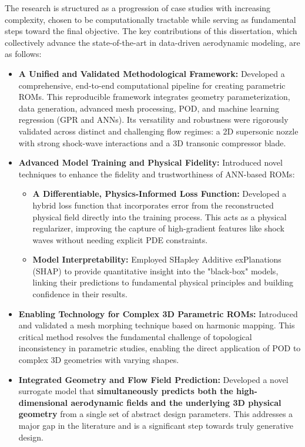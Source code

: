 \documentclass[dsc, EN]{ufabcFHZh}
\begin{document}
{The research is structured as a progression of case studies with increasing complexity, chosen to be computationally tractable while serving as fundamental steps toward the final objective. The key contributions of this dissertation, which collectively advance the state-of-the-art in data-driven aerodynamic modeling, are as follows:

\begin{itemize}
    \item \textbf{A Unified and Validated Methodological Framework:} Developed a comprehensive, end-to-end computational pipeline for creating parametric ROMs. This reproducible framework integrates geometry parameterization, data generation, advanced mesh processing, POD, and machine learning regression (GPR and ANNs). Its versatility and robustness were rigorously validated across distinct and challenging flow regimes: a 2D supersonic nozzle with strong shock-wave interactions and a 3D transonic compressor blade.

    \item \textbf{Advanced Model Training and Physical Fidelity:} Introduced novel techniques to enhance the fidelity and trustworthiness of ANN-based ROMs:
        \begin{itemize}
            \item \textbf{A Differentiable, Physics-Informed Loss Function:} Developed a hybrid loss function that incorporates error from the reconstructed physical field directly into the training process. This acts as a physical regularizer, improving the capture of high-gradient features like shock waves without needing explicit PDE constraints.
            \item \textbf{Model Interpretability:} Employed SHapley Additive exPlanations (SHAP) to provide quantitative insight into the "black-box" models, linking their predictions to fundamental physical principles and building confidence in their results.
        \end{itemize}

    \item \textbf{Enabling Technology for Complex 3D Parametric ROMs:} Introduced and validated a mesh morphing technique based on harmonic mapping. This critical method resolves the fundamental challenge of topological inconsistency in parametric studies, enabling the direct application of POD to complex 3D geometries with varying shapes.

    \item \textbf{Integrated Geometry and Flow Field Prediction:} Developed a novel surrogate model that \textbf{simultaneously predicts both the high-dimensional aerodynamic fields and the underlying 3D physical geometry} from a single set of abstract design parameters. This addresses a major gap in the literature and is a significant step towards truly generative design.


\end{itemize}}
\end{document}
